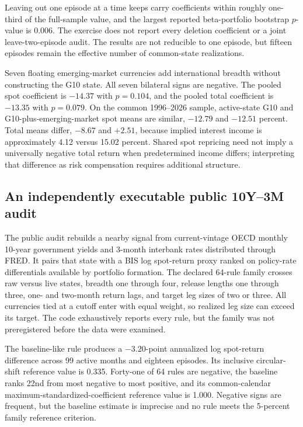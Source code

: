 Leaving out one episode at a time keeps carry coefficients within roughly one-third of the full-sample value, and the largest reported beta-portfolio bootstrap $p$-value is 0.006. The exercise does not report every deletion coefficient or a joint leave-two-episode audit. The results are not reducible to one episode, but fifteen episodes remain the effective number of common-state realizations.

Seven floating emerging-market currencies add international breadth without constructing the G10 state. All seven bilateral signs are negative. The pooled spot coefficient is $-14.37$ with $p=0.104$, and the pooled total coefficient is $-13.35$ with $p=0.079$. On the common 1996--2026 sample, active-state G10 and G10-plus-emerging-market spot means are similar, $-12.79$ and $-12.51$ percent. Total means differ, $-8.67$ and $+2.51$, because implied interest income is approximately 4.12 versus 15.02 percent. Shared spot repricing need not imply a universally negative total return when predetermined income differs; interpreting that difference as risk compensation requires additional structure.

\subsection{An independently executable public 10Y--3M audit}

The public audit rebuilds a nearby signal from current-vintage OECD monthly 10-year government yields and 3-month interbank rates distributed through FRED. It pairs that state with a BIS log spot-return proxy ranked on policy-rate differentials available by portfolio formation. The declared 64-rule family crosses raw versus live states, breadth one through four, release lengths one through three, one- and two-month return lags, and target leg sizes of two or three. All currencies tied at a cutoff enter with equal weight, so realized leg size can exceed its target. The code exhaustively reports every rule, but the family was not preregistered before the data were examined.

The baseline-like rule produces a $-3.20$-point annualized log spot-return difference across 99 active months and eighteen episodes. Its inclusive circular-shift reference value is 0.335. Forty-one of 64 rules are negative, the baseline ranks 22nd from most negative to most positive, and its common-calendar maximum-standardized-coefficient reference value is 1.000. Negative signs are frequent, but the baseline estimate is imprecise and no rule meets the 5-percent family reference criterion.

